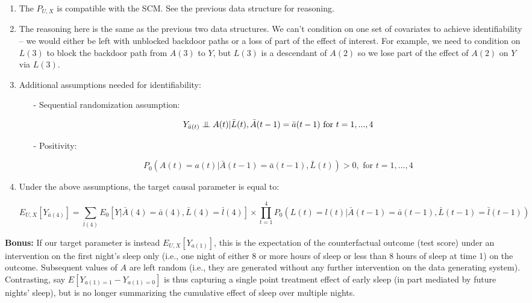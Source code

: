 \documentclass[answers]{exam}
\newcommand\independent{\protect\mathpalette{\protect\independenT}{\perp}}
\def\independenT#1#2{\mathrel{\setbox0\hbox{$#1#2$}%
    \copy0\kern-\wd0\mkern4mu\box0}}
\begin{document}
\begin{solution}

\begin{enumerate}

\item The $P_{U,X}$ is compatible with the SCM. See the previous data structure for reasoning.

\item The reasoning here is the same as the previous two data structures. We can't condition on one set of covariates to achieve identifiability -- we would either be left with unblocked backdoor paths or a loss of part of the effect of interest. For example, we need to condition on $L(3)$ to block the backdoor path from $A(3)$ to $Y$, but $L(3)$ is a descendant of $A(2)$ so we lose part of the effect of $A(2)$ on $Y$ via $L(3)$.

\item Additional assumptions needed for identifiability:

\begin{itemize}
\item[-] Sequential randomization assumption:

\[
Y_{\bar{a}(t)} \independent A(t) | \bar{L}(t), \bar{A}(t-1) = \bar{a}(t-1) \text{ for } t = 1, ..., 4 
\]

\item[-] Positivity:

\[
P_0(A(t) = a(t) | \bar{A}(t-1) = \bar{a}(t-1), \bar{L}(t)) > 0, \text{ for } t = 1,..., 4
\]

\end{itemize}

\item Under the above assumptions, the target causal parameter is equal to:

$$E_{U,X}[Y_{\bar{a}(4)}] = \sum_{\bar{l}(4)} E_0[Y|\bar{A}(4) = \bar{a}(4), \bar{L}(4) = \bar{l}(4)] \times \prod_{t = 1}^4 P_0(L(t) = l(t)|\bar{A}(t-1) = \bar{a}(t-1), \bar{L}(t-1) = \bar{l}(t-1))$$

\end{enumerate}

\noindent\textbf{Bonus:} If our target parameter is instead $E_{U,X}[Y_{a(1)}]$, this is the expectation of the counterfactual outcome (test score) under an intervention on the first night's sleep only (i.e., one night of either 8 or more hours of sleep or less than 8 hours of sleep at time 1) on the outcome. Subsequent values of $A$ are left random (i.e., they are generated without any further intervention on the data generating system). Contrasting, say $E[Y_{a(1) = 1} - Y_{a(1) = 0}]$ is thus capturing a single point treatment effect of early sleep (in part mediated by future nights' sleep), but is no longer summarizing the cumulative effect of sleep over multiple nights.


\end{solution}
\end{document}

